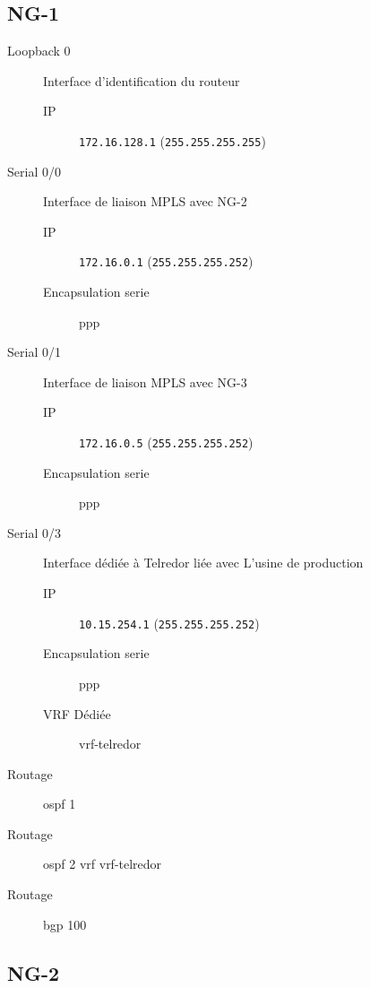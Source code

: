 \subsection{NG-1}

	\begin{description}
		\item[Loopback 0] Interface d'identification du routeur
		\begin{description}
			\item[IP] \texttt{172.16.128.1} (\texttt{255.255.255.255})
		\end{description}

		\item[Serial 0/0] Interface de liaison MPLS avec NG-2
		\begin{description}
			\item[IP] \texttt{172.16.0.1} (\texttt{255.255.255.252})
			\item[Encapsulation serie] ppp
		\end{description}

		\item[Serial 0/1] Interface de liaison MPLS avec NG-3
		\begin{description}
			\item[IP] \texttt{172.16.0.5} (\texttt{255.255.255.252})
			\item[Encapsulation serie] ppp
		\end{description}

		\item[Serial 0/3] Interface dédiée à Telredor liée avec L'usine de production
		\begin{description}
			\item[IP] \texttt{10.15.254.1} (\texttt{255.255.255.252})
			\item[Encapsulation serie] ppp
			\item[VRF Dédiée] vrf-telredor
		\end{description}

		\item[Routage] ospf 1
		\item[Routage] ospf 2 vrf vrf-telredor
		\item[Routage] bgp 100
	\end{description}
\subsection{NG-2}

